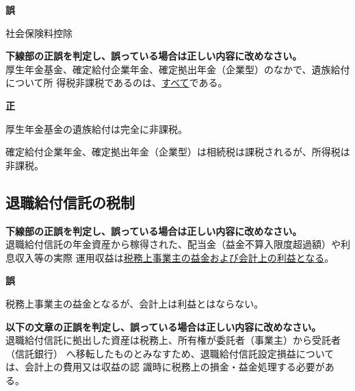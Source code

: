 \begin{answerbox}
  \textbf{誤}

  社会保険料控除
\end{answerbox}


\begin{truefalse}[年金1 H29 問題1(6)\textcircled{3}]
\textbf{下線部の正誤を判定し、誤っている場合は正しい内容に改めなさい。}
\\  

厚生年金基金、確定給付企業年金、確定拠出年金（企業型）のなかで、遺族給付について所
得税非課税であるのは、\underline{すべて}である。
\end{truefalse}

\begin{answerbox}
  \textbf{正}
\end{answerbox}

\begin{explanationbox}
  厚生年金基金の遺族給付は完全に非課税。

確定給付企業年金、確定拠出年金（企業型）は相続税は課税されるが、所得税は非課税。
\end{explanationbox}

\newpage

\subsection{退職給付信託の税制}


\begin{truefalse}[年金1 H29 問題1(6)\textcircled{3}]
\textbf{下線部の正誤を判定し、誤っている場合は正しい内容に改めなさい。}
\\  

退職給付信託の年金資産から稼得された、配当金（益金不算入限度超過額）や利息収入等の実際
運用収益は\underline{税務上事業主の益金および会計上の利益となる}。
\end{truefalse}

\begin{answerbox}
    \textbf{誤}


  税務上事業主の益金となるが、会計上は利益とはならない。
\end{answerbox}


\begin{truefalse}[年金1 H29 問題1(6)\textcircled{3}]
\textbf{以下の文章の正誤を判定し、誤っている場合は正しい内容に改めなさい。}
\\  

退職給付信託に拠出した資産は税務上、所有権が委託者（事業主）から受託者（信託銀行）
へ移転したものとみなすため、退職給付信託設定損益については、会計上の費用又は収益の認
識時に税務上の損金・益金処理する必要がある。
\end{truefalse}

